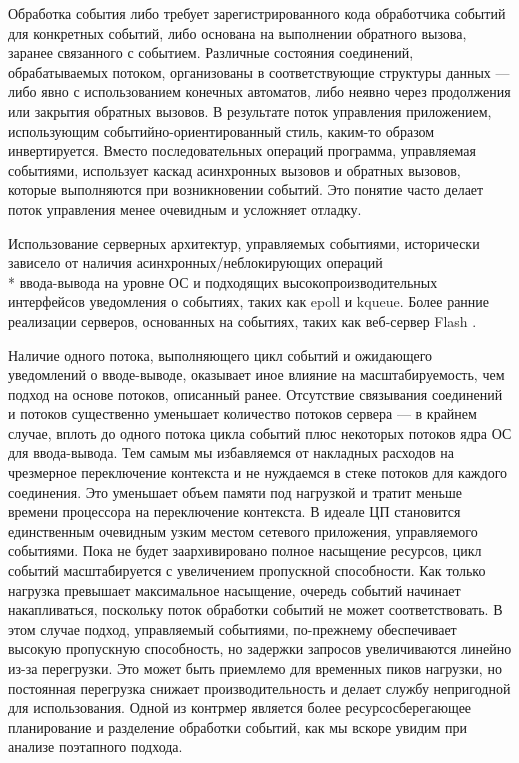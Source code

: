 Обработка события либо требует зарегистрированного кода обработчика событий для конкретных событий, либо основана на выполнении обратного вызова, заранее связанного с событием. Различные состояния соединений, обрабатываемых потоком, организованы в соответствующие структуры данных — либо явно с использованием конечных автоматов, либо неявно через продолжения или закрытия обратных вызовов. В результате поток управления приложением, использующим событийно-ориентированный стиль, каким-то образом инвертируется. Вместо последовательных операций программа, управляемая событиями, использует каскад асинхронных вызовов и обратных вызовов, которые выполняются при возникновении событий. Это понятие часто делает поток управления менее очевидным и усложняет отладку.

Использование серверных архитектур, управляемых событиями, исторически зависело от наличия асинхронных/неблокирующих операций \\* ввода-вывода на уровне ОС и подходящих высокопроизводительных интерфейсов уведомления о событиях, таких как epoll и kqueue. Более ранние реализации серверов, основанных на событиях, таких как веб-сервер Flash \cite{vivek}.

Наличие одного потока, выполняющего цикл событий и ожидающего уведомлений о вводе-выводе, оказывает иное влияние на масштабируемость, чем подход на основе потоков, описанный ранее. Отсутствие связывания соединений и потоков существенно уменьшает количество потоков сервера — в крайнем случае, вплоть до одного потока цикла событий плюс некоторых потоков ядра ОС для ввода-вывода. Тем самым мы избавляемся от накладных расходов на чрезмерное переключение контекста и не нуждаемся в стеке потоков для каждого соединения. Это уменьшает объем памяти под нагрузкой и тратит меньше времени процессора на переключение контекста. В идеале ЦП становится единственным очевидным узким местом сетевого приложения, управляемого событиями. Пока не будет заархивировано полное насыщение ресурсов, цикл событий масштабируется с увеличением пропускной способности. Как только нагрузка превышает максимальное насыщение, очередь событий начинает накапливаться, поскольку поток обработки событий не может соответствовать. В этом случае подход, управляемый событиями, по-прежнему обеспечивает высокую пропускную способность, но задержки запросов увеличиваются линейно из-за перегрузки. Это может быть приемлемо для временных пиков нагрузки, но постоянная перегрузка снижает производительность и делает службу непригодной для использования. Одной из контрмер является более ресурсосберегающее планирование и разделение обработки событий, как мы вскоре увидим при анализе поэтапного подхода.

